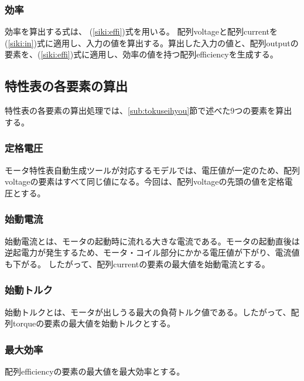 \subsubsection{効率}\label{sub:sub:kouritu}
効率を算出する式は、%
(\ref{siki:effi})式を用いる。
配列voltageと配列currentを(\ref{siki:in})式に適用し、入力の値を算出する。算出した入力の値と、配列outputの要素を、(\ref{siki:effi})式に適用し、効率の値を持つ配列efficiencyを生成する。

\subsection{特性表の各要素の算出}\label{sub:youso_mortoku}
特性表の各要素の算出処理では、\ref{sub:tokuseihyou}節で述べた9つの要素を算出する。

\subsubsection{定格電圧}\label{sub:sub:dennatu}
モータ特性表自動生成ツールが対応するモデルでは、電圧値が一定のため、配列voltageの要素はすべて同じ値になる。今回は、配列voltageの先頭の値を定格電圧とする。

\subsubsection{始動電流}\label{sub:sub:sidouden}
始動電流とは、モータの起動時に流れる大きな電流である。モータの起動直後は逆起電力が発生するため、モータ・コイル部分にかかる電圧値が下がり、電流値も下がる。
したがって、配列currentの要素の最大値を始動電流とする。

\subsubsection{始動トルク}\label{sub:sub:teidoutoruku}
始動トルクとは、モータが出しうる最大の負荷トルク値である。したがって、配列torqueの要素の最大値を始動トルクとする。

\subsubsection{最大効率}\label{sub:sub:saidaikouritu}
配列efficiencyの要素の最大値を最大効率とする。

